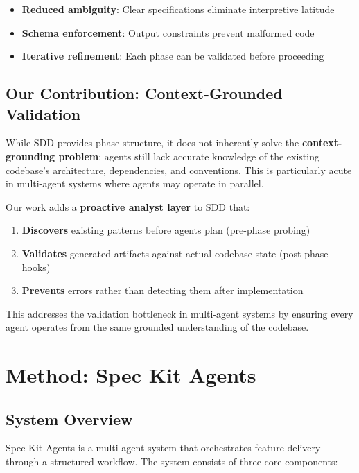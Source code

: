 \documentclass[sigconf,anonymous,review]{acmart}
\begin{document}
\begin{itemize}
  \item \textbf{Reduced ambiguity}: Clear specifications eliminate interpretive latitude
  \item \textbf{Schema enforcement}: Output constraints prevent malformed code
  \item \textbf{Iterative refinement}: Each phase can be validated before proceeding
\end{itemize}

\subsection{Our Contribution: Context-Grounded Validation}

While SDD provides phase structure, it does not inherently solve the \textbf{context-grounding problem}: agents still lack accurate knowledge of the existing codebase's architecture, dependencies, and conventions. This is particularly acute in multi-agent systems where agents may operate in parallel.

Our work adds a \textbf{proactive analyst layer} to SDD that:

\begin{enumerate}
  \item \textbf{Discovers} existing patterns before agents plan (pre-phase probing)
  \item \textbf{Validates} generated artifacts against actual codebase state (post-phase hooks)
  \item \textbf{Prevents} errors rather than detecting them after implementation
\end{enumerate}

This addresses the validation bottleneck in multi-agent systems by ensuring every agent operates from the same grounded understanding of the codebase.

\section{Method: Spec Kit Agents}

\subsection{System Overview}

Spec Kit Agents is a multi-agent system that orchestrates feature delivery through a structured workflow. The system consists of three core components:
\end{document}
